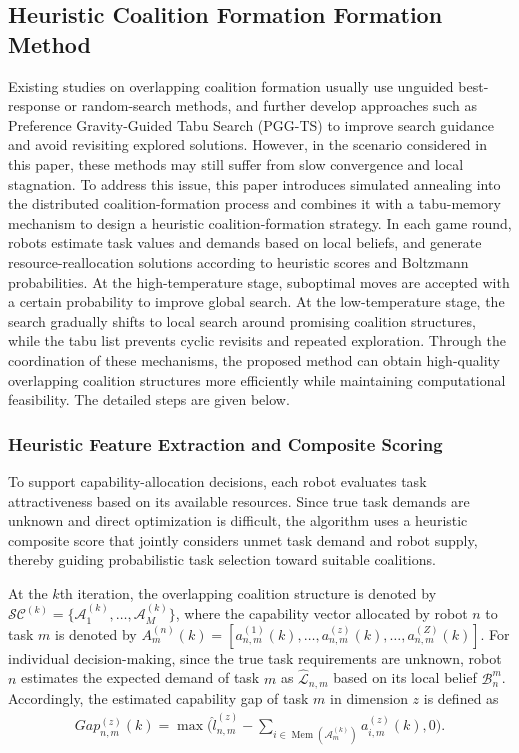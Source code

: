 \documentclass[journal,twoside,web]{ieeecolor}
\begin{document}
\subsection{Heuristic Coalition Formation Formation Method}

Existing studies on overlapping coalition formation usually use unguided best-response or random-search methods, and further develop approaches such as Preference Gravity-Guided Tabu Search (PGG-TS) to improve search guidance and avoid revisiting explored solutions. However, in the scenario considered in this paper, these methods may still suffer from slow convergence and local stagnation. To address this issue, this paper introduces simulated annealing into the distributed coalition-formation process and combines it with a tabu-memory mechanism to design a heuristic coalition-formation strategy. In each game round, robots estimate task values and demands based on local beliefs, and generate resource-reallocation solutions according to heuristic scores and Boltzmann probabilities. At the high-temperature stage, suboptimal moves are accepted with a certain probability to improve global search. At the low-temperature stage, the search gradually shifts to local search around promising coalition structures, while the tabu list prevents cyclic revisits and repeated exploration. Through the coordination of these mechanisms, the proposed method can obtain high-quality overlapping coalition structures more efficiently while maintaining computational feasibility. The detailed steps are given below.

\subsubsection{Heuristic Feature Extraction and Composite Scoring}
To support capability-allocation decisions, each robot evaluates task attractiveness based on its available resources. Since true task demands are unknown and direct optimization is difficult, the algorithm uses a heuristic composite score that jointly considers unmet task demand and robot supply, thereby guiding probabilistic task selection toward suitable coalitions.

At the $k$th iteration, the overlapping coalition structure is denoted by  $\mathcal{SC}^{(k)} = \{ \mathcal{A}_1^{(k)}, \ldots, \mathcal{A}_M^{(k)} \} $, where the capability vector allocated by robot $n$ to task $m$ is denoted by $A_m^{(n)}(k) = \left[ a_{n,m}^{(1)}(k), \ldots, a_{n,m}^{(z)}(k), \ldots, a_{n,m}^{(Z)}(k) \right] $.
For individual decision-making, since the true task requirements are unknown, robot $n$ estimates the expected demand of task $m$ as $\widehat{\mathcal{L}}_{n,m}$ based on its local belief $\mathcal{B}_n^m$. Accordingly, the estimated capability gap of task $m$ in dimension $z$ is defined as
\begin{align}
Gap_{n,m}^{(z)}(k) = \max \Big( \hat{l}_{n,m}^{(z)} - \sum_{i \in \operatorname{Mem}(\mathcal{A}_m^{(k)})} a_{i,m}^{(z)}(k), 0 \Big).
\end{align}
\end{document}

